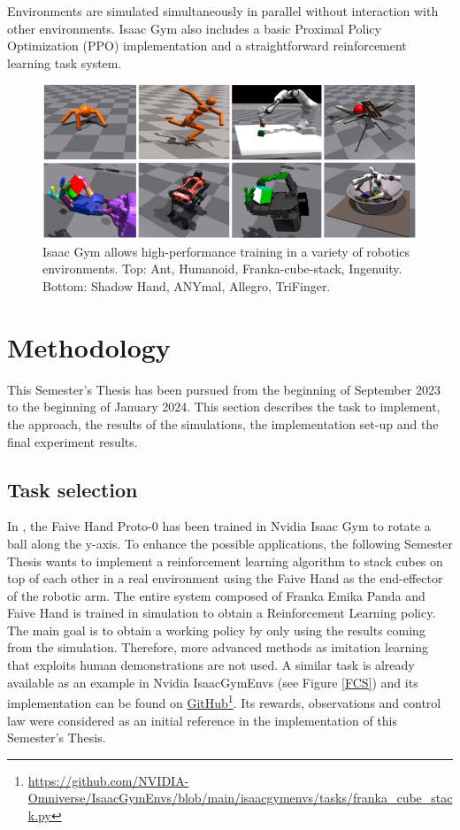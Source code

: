 \documentclass[a4paper]{article}
\begin{document}
    Environments are simulated simultaneously in parallel without interaction with other environments. Isaac Gym also includes a basic Proximal Policy Optimization (PPO) implementation and a straightforward reinforcement learning task system.

\begin{figure}[!hb]
    \centering
    \includegraphics[scale=0.5]{images/Screenshot from 2023-10-10 13-20-57.png}
    \caption{Isaac Gym allows high-performance training in a variety of robotics environments. Top: Ant, Humanoid, Franka-cube-stack, Ingenuity. Bottom: Shadow Hand, ANYmal, Allegro, TriFinger.}
    \label{Some IG}
\end{figure}


\newpage

\section{Methodology}
This Semester’s Thesis has been pursued from the beginning of September 2023 to the beginning of January 2024. This section describes the task to implement, the approach, the results of the simulations, the implementation set-up and the final experiment results.

\subsection{Task selection}

In \cite{toshimitsu2023getting}, the Faive Hand Proto-0 has been trained in Nvidia Isaac Gym to rotate a ball along the y-axis. To enhance the possible applications, the following Semester Thesis wants to implement a reinforcement learning algorithm to stack cubes on top of each other in a real environment using the Faive Hand as the end-effector of the robotic arm. The entire system composed of Franka Emika Panda and Faive Hand is trained in simulation to obtain a Reinforcement Learning policy. The main goal is to obtain a working policy by only using the results coming from the simulation. Therefore, more advanced methods as imitation learning that exploits human demonstrations are not used. A similar task is already available as an example in Nvidia IsaacGymEnvs (see Figure \ref{FCS}) and its implementation can be found on \href{https://github.com/NVIDIA-Omniverse/IsaacGymEnvs/blob/main/isaacgymenvs/tasks/franka_cube_stack.py}{GitHub}\footnote{\url{https://github.com/NVIDIA-Omniverse/IsaacGymEnvs/blob/main/isaacgymenvs/tasks/franka_cube_stack.py}}. Its rewards, observations and control law were considered as an initial reference in the implementation of this Semester's Thesis.
\end{document}
